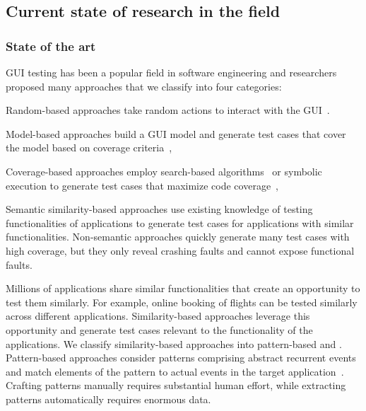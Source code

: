 \subsection{Current state of research in the field }



\subsubsection{State of the art}
GUI testing has been a popular field in software engineering and 
researchers proposed many approaches that we classify into four categories: 
\begin{inparaenum}[(i)]
\item Random-based approaches take random actions to interact with the GUI~\cite{machiry:dynodroid:FSE:2013,ermuth:monkey:ISSTA:2016}.
\item Model-based approaches build a GUI model and generate test cases that cover the model based on coverage criteria~\cite{Gu:PractivalTest:ICSE:2019,Choi:swift:OOPSLA:2013}, 
\item Coverage-based approaches employ search-based algorithms~\cite{dong:TimaMachine:ICSE:2020} or symbolic execution to generate test cases that maximize code coverage~\cite{cheng:guicat:ASE:2016},
\item Semantic similarity-based approaches use existing knowledge of testing functionalities of applications to generate test cases for applications with similar functionalities.
Non-semantic approaches quickly generate many test cases with high coverage, but they only reveal crashing faults and cannot expose functional faults.
\end{inparaenum}

\smallskip 
Millions of applications share similar functionalities that create an opportunity to test them similarly.
For example, online booking of flights can be tested similarly across different applications. 
Similarity-based approaches leverage this opportunity and generate test cases relevant to the functionality of the applications.
We classify similarity-based approaches into pattern-based and \testreuse.
Pattern-based approaches consider patterns comprising abstract recurrent events and match elements of the pattern to actual events in the target application~\cite{mao:crowd:ASE:2017,Mariani:Augusto:ICSE:2018}.
Crafting patterns manually requires substantial human effort, while extracting patterns automatically requires enormous data.


